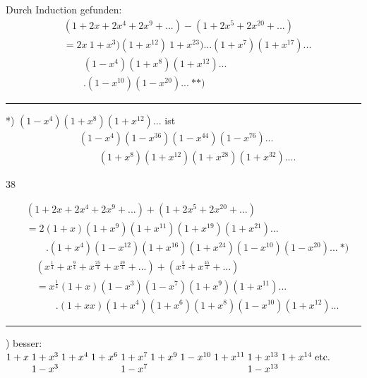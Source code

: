 \begingroup
{}
\par\indent Durch Induction gefunden:
\[\begin{aligned}
&(1+2x+2x^4+2x^9+{.}{.}{.})-(1+2x^5+2x^{20}+{.}{.}{.})\\
&=2x\ 1+x^3)(1+x^{12})\ 1+x^{23}){.}{.}{.}(1+x^7)(1+x^{17}){.}{.}{.}\\
&\qquad(1-x^4)(1+x^8)(1+x^{12}){.}{.}{.}\\
&\qquad.(1-x^{10})(1-x^{20}){.}{.}{.}\ \text{**)}
\end{aligned}\]
\par\smallskip\noindent\rule{.25\linewidth}{.4pt}\par
{\small\par\indent **) $(1-x^4)(1+x^8)(1+x^{12}){.}{.}{.}$ ist
\[\begin{aligned}
&(1-x^4)(1-x^{36})(1-x^{44})(1-x^{76}){.}{.}{.}\\
&\qquad(1+x^8)(1+x^{12})(1+x^{28})(1+x^{32}){.}{.}{.}.
\end{aligned}\]
\par}
\par\bigskip{}\hfill38\par
\clearpage
{}
\[\begin{aligned}
&(1+2x+2x^4+2x^9+{.}{.}{.})+(1+2x^5+2x^{20}+{.}{.}{.})\\
&=2(1+x)(1+x^9)(1+x^{11})(1+x^{19})(1+x^{21}){.}{.}{.}\\
&\qquad.(1+x^4)(1-x^{12})(1+x^{16})(1+x^{24})(1-x^{10})(1-x^{20}){.}{.}{.}\ \text{*)}
\end{aligned}\]
\[\begin{aligned}
&(x^{\frac14}+x^{\frac94}+x^{\frac{25}4}+x^{\frac{49}4}+{.}{.}{.})+(x^{\frac54}+x^{\frac{45}4}+{.}{.}{.})\\
&=x^{\frac14}(1+x)(1-x^3)(1-x^7)(1+x^9)(1+x^{11}){.}{.}{.}\\
&\qquad.(1+xx)(1+x^4)(1+x^6)(1+x^8)(1-x^{10})(1+x^{12}){.}{.}{.}
\end{aligned}\]
\par\smallskip\noindent\rule{.25\linewidth}{.4pt}\par
{\small\par\indent *) besser: $\begin{array}[t]{@{}c@{\;}c@{\;}c@{\;}c@{\;}c@{\;}c@{\;}c@{\;}c@{\;}c@{\;}c@{\;}l@{}}
1+x&1+x^3&1+x^4&1+x^6&1+x^7&1+x^9&1-x^{10}&1+x^{11}&1+x^{13}&1+x^{14}&\text{etc.}\\
&1-x^3&&&1-x^7&&&&1-x^{13}&&
\end{array}$\par}
\clearpage
\endgroup
